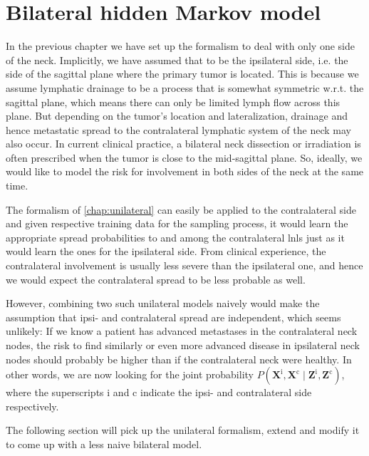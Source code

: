 \documentclass[\relativeRoot/main.tex]{subfiles}
\begin{document}
\chapter{Bilateral hidden Markov model}
\label{chap:bilateral}

In the previous chapter we have set up the formalism to deal with only one side of the neck. Implicitly, we have assumed that to be the ipsilateral side, i.e. the side of the sagittal plane where the primary tumor is located. This is because we assume lymphatic drainage to be a process that is somewhat symmetric w.r.t. the sagittal plane, which means there can only be limited lymph flow across this plane. But depending on the tumor's location and lateralization, drainage and hence metastatic spread to the contralateral lymphatic system of the neck may also occur. In current clinical practice, a bilateral neck dissection or irradiation is often prescribed when the tumor is close to the mid-sagittal plane. So, ideally, we would like to model the risk for involvement in both sides of the neck at the same time.

The formalism of \cref{chap:unilateral} can easily be applied to the contralateral side and given respective training data for the sampling process, it would learn the appropriate spread probabilities to and among the contralateral \glspl{lnl} just as it would learn the ones for the ipsilateral side. From clinical experience, the contralateral involvement is usually less severe than the ipsilateral one, and hence we would expect the contralateral spread to be less probable as well. 

However, combining two such unilateral models naively would make the assumption that ipsi- and contralateral spread are independent, which seems unlikely: If we know a patient has advanced metastases in the contralateral neck nodes, the risk to find similarly or even more advanced disease in ipsilateral neck nodes should probably be higher than if the contralateral neck were healthy. In other words, we are now looking for the joint probability $P \left( \mathbf{X}^\text{i}, \mathbf{X}^\text{c} \mid \mathbf{Z}^\text{i}, \mathbf{Z}^\text{c} \right)$, where the superscripts $\text{i}$ and $\text{c}$ indicate the ipsi- and contralateral side respectively.

The following section will pick up the unilateral formalism, extend and modify it to come up with a less naive bilateral model.




\end{document}
